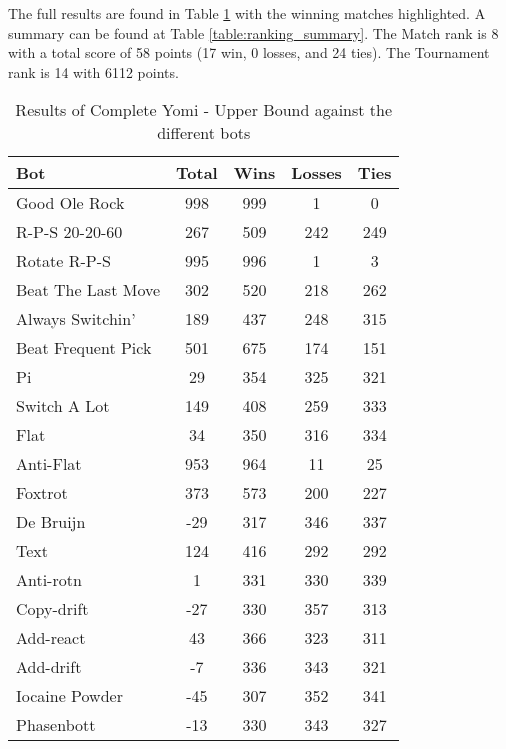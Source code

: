 The full results are found in Table \ref{table:Yomi_UpperBound_results} with the winning matches highlighted. A summary can be found at Table \ref{table:ranking_summary}. The Match rank is 8 with a total score of 58 points (17 win, 0 losses, and 24 ties). The Tournament rank is 14 with 6112 points.

\begin{table}
    \caption{Results of Complete Yomi - Upper Bound against the different bots}
    \label{table:Yomi_UpperBound_results}
    \centering
    \begin{tabular}{|l|c|c|c|c|}
        \hline
        \textbf{Bot} & \textbf{Total} & \textbf{Wins} & \textbf{Losses} & \textbf{Ties} \\ \hline
\rowcolor{HighlightRowColor} Good Ole Rock & 998 & 999 & 1 & 0 \\ \hline 
\rowcolor{HighlightRowColor} R-P-S 20-20-60 & 267 & 509 & 242 & 249 \\ \hline 
\rowcolor{HighlightRowColor} Rotate R-P-S & 995 & 996 & 1 & 3 \\ \hline 
\rowcolor{HighlightRowColor} Beat The Last Move & 302 & 520 & 218 & 262 \\ \hline 
\rowcolor{HighlightRowColor} Always Switchin' & 189 & 437 & 248 & 315 \\ \hline 
\rowcolor{HighlightRowColor} Beat Frequent Pick & 501 & 675 & 174 & 151 \\ \hline 
Pi & 29 & 354 & 325 & 321 \\ \hline 
\rowcolor{HighlightRowColor} Switch A Lot & 149 & 408 & 259 & 333 \\ \hline 
Flat & 34 & 350 & 316 & 334 \\ \hline 
\rowcolor{HighlightRowColor} Anti-Flat & 953 & 964 & 11 & 25 \\ \hline 
\rowcolor{HighlightRowColor} Foxtrot & 373 & 573 & 200 & 227 \\ \hline 
De Bruijn & -29 & 317 & 346 & 337 \\ \hline 
\rowcolor{HighlightRowColor} Text & 124 & 416 & 292 & 292 \\ \hline 
Anti-rotn & 1 & 331 & 330 & 339 \\ \hline 
Copy-drift & -27 & 330 & 357 & 313 \\ \hline 
Add-react & 43 & 366 & 323 & 311 \\ \hline 
Add-drift & -7 & 336 & 343 & 321 \\ \hline 
Iocaine Powder & -45 & 307 & 352 & 341 \\ \hline 
Phasenbott & -13 & 330 & 343 & 327 \\ \hline 

\end{tabular}
\end{table}
